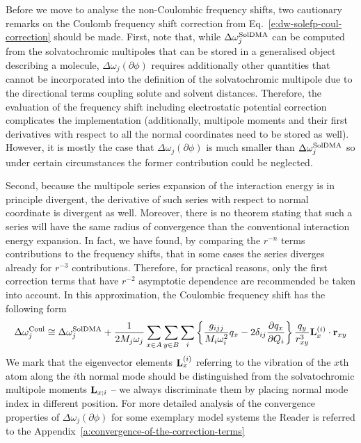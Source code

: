 \documentclass[b5paper,oneside,fleqn,11pt]{book}
\newcommand{\fderiv}[2]{\ensuremath{
    \frac{\partial #1}{\partial #2}}}
\begin{document}
\begin{refsection}
Before we move to analyse the non\hyp{}Coulombic frequency shifts, two cautionary remarks
on the Coulomb frequency shift correction from Eq.~\eqref{e:dw-solefp-coul-correction} should be made.
First, note that, while $\Delta \omega_j^{\rm SolDMA}$ can be computed from the
solvatochromic multipoles that can be stored in a generalised object
describing a molecule, $\Delta\omega_j({\partial\phi})$ requires 
additionally other quantities that cannot be incorporated
into the definition of the solvatochromic multipole due to the directional
terms coupling solute and solvent distances. Therefore,
the evaluation of the frequency shift including electrostatic potential
correction complicates the implementation (additionally, multipole moments
and their first derivatives with respect to all the normal coordinates need 
to be stored as well). However, it is mostly the case
that $\Delta\omega_j({\partial\phi})$ is much smaller than $\Delta \omega_j^{\rm SolDMA}$
so under certain circumstances the former contribution could be
neglected.

Second, because the multipole series expansion of the interaction energy
is in principle divergent, the derivative of such series
with respect to normal coordinate is divergent as well. Moreover, 
there is no theorem stating that such a series will have the same radius of convergence
than the conventional interaction energy expansion. In fact,
we have found, by comparing the $r^{-n}$ terms contributions to the frequency
shifts, that in some cases the series diverges already for 
$r^{-3}$ contributions. Therefore, for practical reasons, only
the first correction terms that have $r^{-2}$ asymptotic dependence
are recommended be taken into account. In this approximation,
the Coulombic frequency shift has the following form
%
\begin{equation} \label{e:dw-solefp-coul-working}
\Delta\omega_j^{\rm Coul} \cong \Delta\omega_j^{\rm SolDMA} + \frac{1}{2M_j\omega_j}
\sum_{x \in A}\sum_{y \in B} \sum_i \left\{ 
\frac{g_{ijj}}{M_i\omega_i^2} q_x 
- 2\delta_{ij} \fderiv{q_x}{Q_i} \right\} \frac{q_y}{r_{xy}^3} {\bf L}_x^{(i)} \cdot {\bf r}_{xy} 
\end{equation}
%
We mark that the eigenvector elements ${\bf L}_x^{(i)}$
referring to the vibration of the $x$th atom along the $i$th normal mode
should be distinguished from the solvatochromic multipole 
moments ${\bf L}_{x;i}$ -- we always discriminate them by placing
normal mode index in different position.
For more detailed analysis of the convergence properties
of $\Delta\omega_j({\partial\phi})$ for some exemplary model 
systems the Reader is referred to
the Appendix~\ref{a:convergence-of-the-correction-terms}



\end{refsection}
\end{document}
